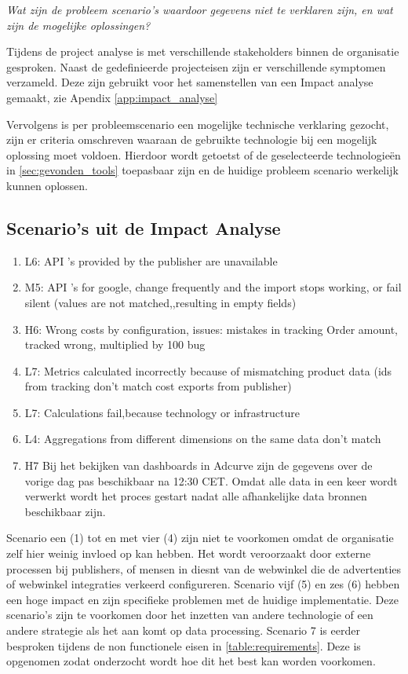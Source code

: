 \textit{Wat zijn de probleem scenario's waardoor gegevens niet te verklaren zijn, en wat zijn de mogelijke oplossingen?}

Tijdens de project analyse is met verschillende stakeholders binnen de organisatie gesproken. Naast de gedefinieerde projecteisen zijn er verschillende symptomen verzameld. Deze zijn gebruikt voor het samenstellen van een Impact analyse gemaakt, zie Apendix \ref{app:impact_analyse}

Vervolgens is per probleemscenario een mogelijke technische verklaring gezocht, zijn er criteria omschreven waaraan de gebruikte technologie bij een mogelijk oplossing moet voldoen. Hierdoor wordt getoetst of de geselecteerde technologieën in \ref{sec:gevonden_tools} toepasbaar zijn en de huidige probleem scenario werkelijk kunnen oplossen.

\subsection{Scenario's uit de Impact Analyse}

\begin{enumerate}
    \item L6: API 's provided by the publisher are unavailable
    \item M5: API 's for google, change frequently and the import stops working, or fail silent (values are not matched,,resulting in empty fields)
    \item H6: Wrong costs by configuration, issues: mistakes in tracking Order amount, tracked wrong, multiplied by 100 bug
    \item L7: Metrics calculated incorrectly because of mismatching product data (ids from tracking don't match cost exports from publisher)
    \item L7: Calculations fail,because technology or infrastructure 
    \item L4: Aggregations from different dimensions on the same data
    don't match
    \item H7 Bij het bekijken van dashboards in Adcurve zijn de gegevens over de vorige dag pas beschikbaar na 12:30 CET. Omdat alle data in een keer wordt verwerkt wordt het proces gestart nadat alle afhankelijke data bronnen beschikbaar zijn.
\end{enumerate}

Scenario een (1) tot en met vier (4) zijn niet te voorkomen omdat de organisatie zelf hier weinig invloed op kan hebben. Het wordt veroorzaakt door externe processen bij publishers, of mensen in diesnt van de webwinkel die de advertenties of webwinkel integraties verkeerd configureren. Scenario vijf (5) en zes (6) hebben een hoge impact en zijn specifieke problemen met de huidige implementatie. Deze scenario's zijn te voorkomen door het inzetten van andere technologie of een andere strategie als het aan komt op data processing.
Scenario 7 is eerder besproken tijdens de non functionele eisen in \ref{table:requirements}. Deze is opgenomen zodat onderzocht wordt hoe dit het best kan worden voorkomen.  


